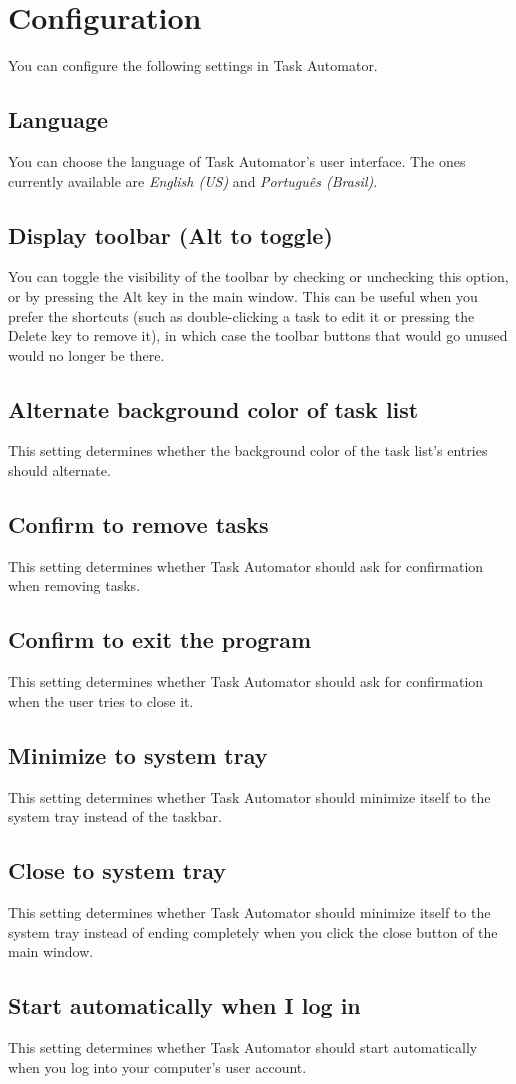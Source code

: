 \documentclass{article}
\begin{document}
\section{Configuration}
You can configure the following settings in Task Automator.

\subsection{Language}
You can choose the language of Task Automator's user interface. The ones currently available are \emph{English (US)} and \emph{Português (Brasil)}.

\subsection{Display toolbar (Alt to toggle)}
You can toggle the visibility of the toolbar by checking or unchecking this option, or by pressing the Alt key in the main window. This can be useful when you prefer the shortcuts (such as double-clicking a task to edit it or pressing the Delete key to remove it), in which case the toolbar buttons that would go unused would no longer be there.

\subsection{Alternate background color of task list}
This setting determines whether the background color of the task list's entries should alternate.

\subsection{Confirm to remove tasks}
This setting determines whether Task Automator should ask for confirmation when removing tasks.

\subsection{Confirm to exit the program}
This setting determines whether Task Automator should ask for confirmation when the user tries to close it.

\subsection{Minimize to system tray}
This setting determines whether Task Automator should minimize itself to the system tray instead of the taskbar.

\subsection{Close to system tray}
This setting determines whether Task Automator should minimize itself to the system tray instead of ending completely when you click the close button of the main window.

\subsection{Start automatically when I log in}
This setting determines whether Task Automator should start automatically when you log into your computer's user account.
\end{document}
